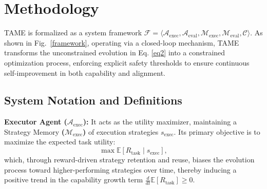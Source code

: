 \documentclass{article}
\theoremstyle{plain}
\theoremstyle{definition}
\theoremstyle{remark}
\begin{document}






\section{Methodology}
\label{sec:methodology}

TAME is formalized as a system framework $\mathcal{F} = \langle \mathcal{A}_{\text{exec}}, \mathcal{A}_{\text{eval}}, \mathcal{M}_{\text{exec}}, \mathcal{M}_{\text{eval}}, \mathcal{C} \rangle$. As shown in Fig.~\ref{framework}, operating via a closed-loop mechanism, TAME transforms the unconstrained evolution in Eq. \ref{eq2} into a constrained optimization process, enforcing explicit safety thresholds to ensure continuous self-improvement in both capability and alignment.

\subsection{System Notation and Definitions}

\textbf{Executor Agent ($\mathcal{A}_{\text{exec}}$):} 
It acts as the utility maximizer, maintaining a Strategy Memory\textbf{ ($\mathcal{M}_{\text{exec}}$)} of execution strategies $s_{\text{exec}}$. 
Its primary objective is to maximize the expected task utility:
\begin{equation}
\label{eq4}
    \max \mathbb{E}[R_{\text{task}} \mid s_{\text{exec}}],
\end{equation}
which, through reward-driven strategy retention and reuse, biases the evolution process toward higher-performing strategies over time, thereby inducing a positive trend in the capability growth term $\frac{d}{dt}\mathbb{E}[R_{\text{task}}] \ge 0$.
\end{document}
